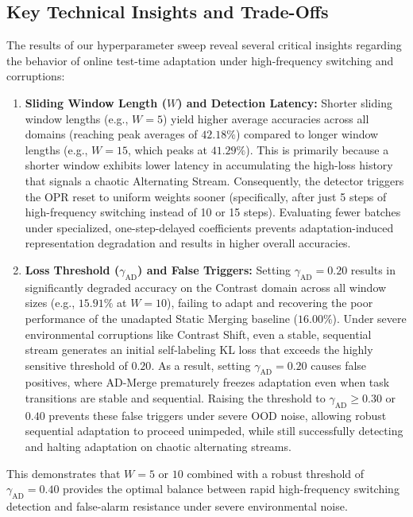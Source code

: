 \documentclass{article}
\theoremstyle{plain}
\theoremstyle{definition}
\theoremstyle{remark}
\begin{document}
\subsection{Key Technical Insights and Trade-Offs}
The results of our hyperparameter sweep reveal several critical insights regarding the behavior of online test-time adaptation under high-frequency switching and corruptions:
\begin{enumerate}
    \item \textbf{Sliding Window Length ($W$) and Detection Latency:}
    Shorter sliding window lengths (e.g., $W = 5$) yield higher average accuracies across all domains (reaching peak averages of \textbf{$42.18\%$}) compared to longer window lengths (e.g., $W = 15$, which peaks at $41.29\%$). This is primarily because a shorter window exhibits lower latency in accumulating the high-loss history that signals a chaotic Alternating Stream. Consequently, the detector triggers the OPR reset to uniform weights sooner (specifically, after just 5 steps of high-frequency switching instead of 10 or 15 steps). Evaluating fewer batches under specialized, one-step-delayed coefficients prevents adaptation-induced representation degradation and results in higher overall accuracies.
    
    \item \textbf{Loss Threshold ($\gamma_{\text{AD}}$) and False Triggers:}
    Setting $\gamma_{\text{AD}} = 0.20$ results in significantly degraded accuracy on the Contrast domain across all window sizes (e.g., $15.91\%$ at $W=10$), failing to adapt and recovering the poor performance of the unadapted Static Merging baseline ($16.00\%$). Under severe environmental corruptions like Contrast Shift, even a stable, sequential stream generates an initial self-labeling KL loss that exceeds the highly sensitive threshold of $0.20$. As a result, setting $\gamma_{\text{AD}} = 0.20$ causes false positives, where AD-Merge prematurely freezes adaptation even when task transitions are stable and sequential. Raising the threshold to $\gamma_{\text{AD}} \geq 0.30$ or $0.40$ prevents these false triggers under severe OOD noise, allowing robust sequential adaptation to proceed unimpeded, while still successfully detecting and halting adaptation on chaotic alternating streams.
\end{enumerate}
This demonstrates that $W = 5$ or $10$ combined with a robust threshold of $\gamma_{\text{AD}} = 0.40$ provides the optimal balance between rapid high-frequency switching detection and false-alarm resistance under severe environmental noise.
\end{document}
